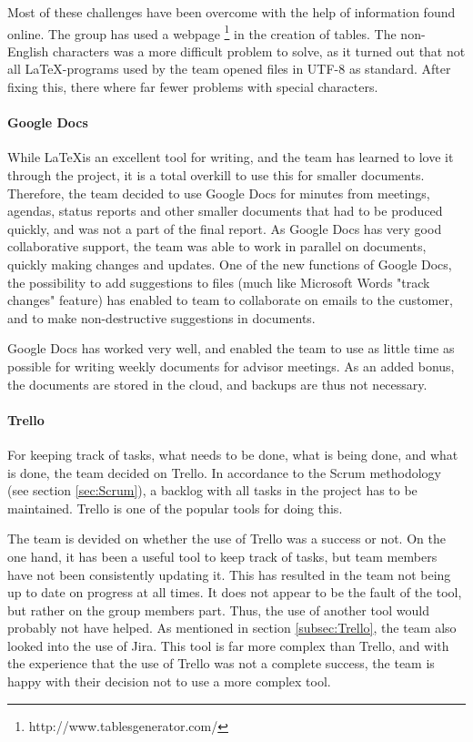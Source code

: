 \documentclass[11pt,a4paper,titlepage,oneside]{report}
\begin{document}
Most of these challenges have been overcome with the help of information found online. The group has used a webpage \footnote{http://www.tablesgenerator.com/} in the creation of tables. The non-English characters was a more difficult problem to solve, as it turned out that not all \LaTeX-programs used by the team opened files in UTF-8 as standard. After fixing this, there where far fewer problems with special characters.

\paragraph{Google Docs}
While \LaTeX is an excellent tool for writing, and the team has learned to love it through the project, it is a total overkill to use this for smaller documents. Therefore, the team decided to use Google Docs for minutes from meetings, agendas, status reports and other smaller documents that had to be produced quickly, and was not a part of the final report. As Google Docs has very good collaborative support, the team was able to work in parallel on documents, quickly making changes and updates. One of the new functions of Google Docs, the possibility to add suggestions to files (much like Microsoft Words "track changes" feature) has enabled to team to collaborate on emails to the customer, and to make non-destructive suggestions in documents.

Google Docs has worked very well, and enabled the team to use as little time as possible for writing weekly documents for advisor meetings. As an added bonus, the documents are stored in the cloud, and backups are thus not necessary. 

\paragraph{Trello}
For keeping track of tasks, what needs to be done, what is being done, and what is done, the team decided on Trello. In accordance to the Scrum methodology (see section \ref{sec:Scrum}), a backlog with all tasks in the project has to be maintained. Trello is one of the popular tools for doing this. 

The team is devided on whether the use of Trello was a success or not. On the one hand, it has been a useful tool to keep track of tasks, but team members have not been consistently updating it. This has resulted in the team not being up to date on progress at all times. It does not appear to be the fault of the tool, but rather on the group members part. Thus, the use of another tool would probably not have helped. As mentioned in section \ref{subsec:Trello}, the team also looked into the use of Jira. This tool is far more complex than Trello, and with the experience that the use of Trello was not a complete success, the team is happy with their decision not to use a more complex tool. 
\end{document}
